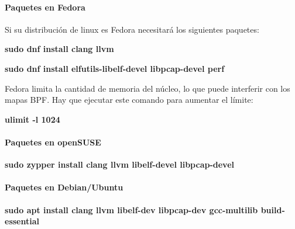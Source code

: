 \paragraph{Paquetes en Fedora}

Si su distribución de linux es Fedora necesitará los siguientes paquetes:

\begin{center}
    \textbf{sudo dnf install clang llvm}
\end{center}
\begin{center}
    \textbf{sudo dnf install elfutils-libelf-devel libpcap-devel perf}
\end{center}
Fedora limita la cantidad de memoria del núcleo, lo que puede interferir con los mapas BPF. Hay que ejecutar este comando para aumentar el límite:
\begin{center}
    \textbf{ulimit -l 1024}
\end{center}

\paragraph{Paquetes en openSUSE}

\begin{center}
    \textbf{sudo zypper install clang llvm libelf-devel libpcap-devel}
\end{center}
\paragraph{Paquetes en Debian/Ubuntu}
\begin{center}
    \textbf{sudo apt install clang llvm libelf-dev libpcap-dev gcc-multilib build-essential}
\end{center}



